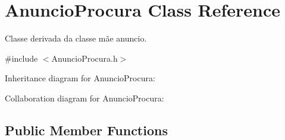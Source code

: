 \hypertarget{class_anuncio_procura}{\section{Anuncio\+Procura Class Reference}
\label{class_anuncio_procura}
}


Classe derivada da classe mãe anuncio.  




{\ttfamily \#include $<$Anuncio\+Procura.\+h$>$}



Inheritance diagram for Anuncio\+Procura\+:


Collaboration diagram for Anuncio\+Procura\+:
\subsection*{Public Member Functions}
